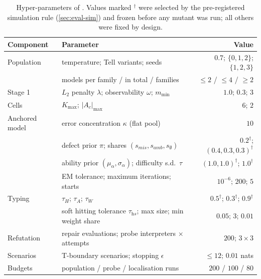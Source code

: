 \begin{table}[t]
\caption{Hyper-parameters of \specdx. Values marked $^\dagger$ were selected by the pre-registered simulation rule (\cref{sec:eval-sim}) and frozen before any mutant was run; all others were fixed by design.}
\label{tab:hparams}
\small
\begin{tabular}{@{}llr@{}}
\toprule
Component & Parameter & Value \\
\midrule
Population & temperature; Tell variants; seeds & $0.7$; $\{0,1,2\}$; $\{1,2,3\}$ \\
           & models per family / in total / families & $\le2$ / $\le4$ / $\ge2$ \\
Stage 1    & $L_2$ penalty $\lambda$; observability $\omega$; $m_{\min}$ & $1.0$; $0.3$; $3$ \\
Cells      & $K_{\max}$; $|A_c|_{\max}$ & $6$; $2$ \\
Anchored model & error concentration $\kappa$ (flat pool) & $10$ \\
           & defect prior $\pi$; shares $(s_{\textit{mis}},s_{\textit{amb}},s_\emptyset)$ & $0.2^\dagger$; $(0.4,0.3,0.3)^\dagger$ \\
           & ability prior $(\mu_\alpha,\sigma_\alpha)$; difficulty s.d.\ $\tau$ & $(1.0,1.0)^\dagger$; $1.0^\dagger$ \\
           & EM tolerance; maximum iterations; starts & $10^{-6}$; $200$; $5$ \\
Typing     & $\tau_H$; $\tau_A$; $\tau_W$ & $0.5^\dagger$; $0.3^\dagger$; $0.9^\dagger$ \\
           & soft hitting tolerance $\tau_{\textit{hs}}$; max size; min weight share & $0.05$; $3$; $0.01$ \\
Refutation & repair evaluations; probe interpreters $\times$ attempts & $200$; $3\times3$ \\
Scenarios  & T-boundary scenarios; stopping $\epsilon$ & $\le12$; $0.01$ nats \\
Budgets    & population / probe / localisation runs & $200$ / $100$ / $80$ \\
\bottomrule
\end{tabular}
\end{table}
